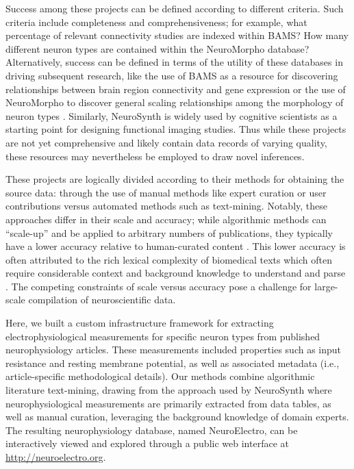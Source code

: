 \documentclass{template/frontiersSCNS} %
\begin{document}
Success among these projects can be defined according to different criteria.  
Such criteria include completeness and comprehensiveness; 
for example, what percentage of relevant connectivity studies are indexed within BAMS? 
How many different neuron types are contained within the NeuroMorpho database?  
Alternatively, success can be defined in terms of the utility of these databases in driving subsequent research, like the use of BAMS as a resource for discovering relationships between brain region connectivity and gene expression \citep{french_relationships_2011} or the use of NeuroMorpho to discover general scaling relationships among the morphology of neuron types \citep{teeter_general_2011}. 
Similarly, NeuroSynth is widely used by cognitive scientists as a starting point for designing functional imaging studies.  
Thus while these projects are not yet comprehensive and likely contain data records of varying quality, these resources may nevertheless be employed to draw novel inferences.

These projects are logically divided according to their methods for obtaining the source data: through the use of manual methods like expert curation or user contributions versus automated methods such as text-mining.  
Notably, these approaches differ in their scale and accuracy; while algorithmic methods can ``scale-up'' and be applied to arbitrary numbers of publications, they typically have a lower accuracy relative to human-curated content \citep{french_automated_2009}.  
This lower accuracy is often attributed to the rich lexical complexity of biomedical texts which often require considerable context and background knowledge to understand and parse \citep{dickman_tough_2003,ambert_text-mining_2012}.  
The competing constraints of scale versus accuracy pose a challenge for large-scale compilation of neuroscientific data.

Here, we built a custom infrastructure framework for extracting electrophysiological measurements for specific neuron types from published neurophysiology articles.  
These measurements included properties such as input resistance and resting membrane potential, as well as associated metadata (i.e., article-specific methodological details).  Our methods combine algorithmic literature text-mining, drawing from the approach used by NeuroSynth \citep{yarkoni_large-scale_2011} where neurophysiological measurements are primarily extracted from data tables, as well as manual curation, leveraging the background knowledge of domain experts.  
The resulting neurophysiology database, named NeuroElectro, can be interactively viewed and explored through a public web interface at \url{http://neuroelectro.org}.
\end{document}

